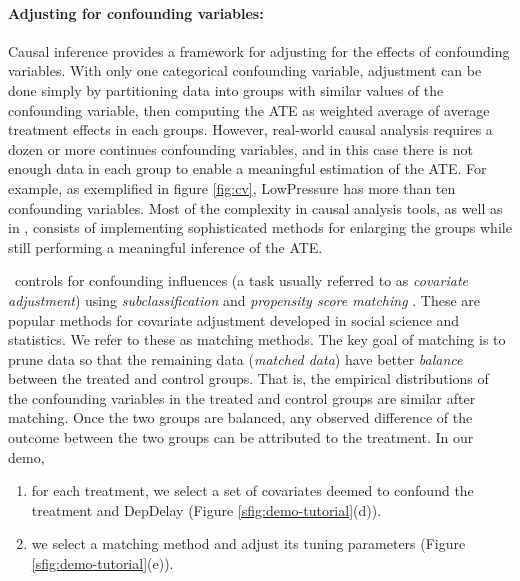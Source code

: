  \paragraph{\bf Adjusting for confounding variables:}
Causal inference provides a framework for adjusting for the effects of
confounding variables.
 With only one categorical confounding variable, adjustment can be
 done simply by partitioning data into
 groups with similar values of the confounding variable, then
 computing the ATE as  weighted average of average treatment effects in each groups. However, real-world causal analysis requires a dozen or more continues confounding variables, and in this case there is not enough data in each group to enable a meaningful estimation of the ATE. For example, as exemplified in figure \ref{fig:cv}, LowPressure has more than ten confounding variables.  Most of the complexity in causal analysis tools, as well as in \GSQL, consists of implementing sophisticated methods for enlarging the groups while still performing a meaningful inference of the ATE.

\GSQL\ controls for confounding influences (a task usually referred to
as {\em covariate adjustment}) using {\em subclassification} and {\it propensity score matching} \cite{Rubin1983b,IacKinPor09,rosenbaum1984reducing}.
These are popular methods for covariate adjustment developed in social
science and statistics. We refer to these as matching methods.
The key goal of matching is to prune data so that
the remaining data ({\em matched data}) have better \emph{balance}
between the treated and control groups. That is, the empirical
distributions of the confounding variables in the treated and control
groups are similar after matching.
Once the two groups are balanced, any observed difference of the
outcome between the two groups can be attributed to the treatment. In
our demo,
     \begin{enumerate}
      \item for each treatment, we select a set of covariates deemed to confound the treatment and DepDelay (Figure \ref{sfig:demo-tutorial}(d)).
      \item we select a matching method and adjust its tuning parameters (Figure \ref{sfig:demo-tutorial}(e)).
\end{enumerate}

